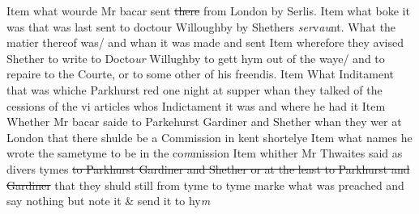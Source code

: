 \documentclass[12pt, a4paper]{book}
\begin{document}
				\marginpar[\vspace{0.5cm}{\textcolor{Gray}{13}}]{}
			 Item what wourde Mr bacar sent \sout{there} from London by Serlis. 
				\marginpar[\vspace{0.5cm}{\textcolor{Gray}{14}}]{}
			 Item what boke
			 it was that was last sent to doctour Willoughby by  Shethers \textit{ser}v\textit{au}nt. What the matier thereof was/ and whan it  was made and sent 
				\marginpar[\vspace{0.5cm}{\textcolor{Gray}{15}}]{}
			 Item wherefore they avised Shether to write to Docto\textit{ur} Willughby to gett hym out of the waye/ and to repaire to the Courte, or to some other of his freendis. 
				\marginpar[\vspace{0.5cm}{\textcolor{Gray}{16}}]{}
			 Item What Inditament that was whiche Parkhurst red one night at supper whan they talked of the cessions of the vi articles whos Indictament it was and where he had it 
				\marginpar[\vspace{0.5cm}{\textcolor{Gray}{17}}]{}
			 Item Whether 
			Mr bacar saide to Parkehurst Gardiner and Shether whan they wer at London that there shulde be a Commission in kent shortelye 
				\marginpar[\vspace{0.5cm}{\textcolor{Gray}{18}}]{}
			 Item what names he wrote the sametyme to be in the co\textit{m}mission  
				\marginpar[\vspace{0.5cm}{\textcolor{Gray}{19}}]{}
			 Item whither Mr Thwaites said as divers tymes \sout{to Parkhurst Gardiner and Shether or at the least to Parkhurst and  Gardiner} that they shuld still from tyme to tyme marke what was preached and say nothing but note it \& send it to hy\textit{m}
			
\end{document}
